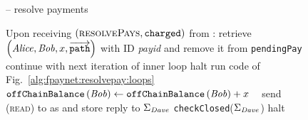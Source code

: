   \begin{figure}[H]
    \begin{systembox}{\fpaynet{} -- resolve payments}
      \begin{algorithmic}[1]
        \State Upon receiving $\left(\textsc{resolvePays},
        \mathtt{charged}\right)$ from \simulator:
        \Indent
              \State retrieve $\left(\mathit{Alice}, \mathit{Bob}, x,
              \overrightarrow{\mathtt{path}}\right)$ with ID \textit{payid} and
              remove it from \texttt{pendingPay}
              \If{$\dave{} = \bot$} 
                \State continue with next iteration of inner loop
                \State halt 
                \label{alg:fpaynet:resolvepay:halt:path}
                \State run code of Fig.~\ref{alg:fpaynet:resolvepay:loops}
                \State $\mathtt{offChainBalance}\left(\mathit{Bob}\right) \gets
                \mathtt{offChainBalance}\left(\mathit{Bob}\right) + x$
                \label{alg:fpaynet:resolvepay:corr:credit}
              \Else \ 
                \State send (\textsc{read}) to \ledger{} as \dave{} and store
                reply to $\Sigma_{\mathit{Dave}}$
                \State \texttt{checkClosed}($\Sigma_{\mathit{Dave}}$)
                \label{alg:fpaynet:resolvepay:haltcond:ds}
                  \State halt 
                  \label{alg:fpaynet:resolvepay:halt:ds}
                  \label{alg:fpaynet:resolvepay:haltcond:rel}

\end{algorithmic}
\end{systembox}
\end{figure}
